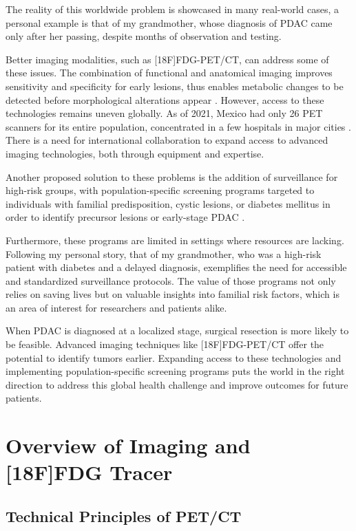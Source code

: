 \documentclass[11pt]{article} %
\begin{document}
The reality of this worldwide problem is showcased in many real-world cases, a personal example is that of my grandmother, whose diagnosis of PDAC came only after her passing, despite months of observation and testing.

Better imaging modalities, such as [18F]FDG-PET/CT, can address some of these issues. The combination of functional and anatomical imaging improves sensitivity and specificity for early lesions, thus enables metabolic changes to be detected before morphological alterations appear \cite{Pu2021}. However, access to these technologies remains uneven globally. As of 2021, Mexico had only 26 PET scanners for its entire population, concentrated in a few hospitals in major cities \cite{statista1}. There is a need for international collaboration to expand access to advanced imaging technologies, both through equipment and expertise.


Another proposed solution to these problems is the addition of surveillance for high-risk groups, with population-specific screening programs targeted to individuals with familial predisposition, cystic lesions, or diabetes mellitus in order to identify precursor lesions or early-stage PDAC \cite{Cancers2023}.

Furthermore, these programs are limited in settings where resources are lacking. Following my personal story, that of my grandmother, who was a high-risk patient with diabetes and a delayed diagnosis, exemplifies the need for accessible and standardized surveillance protocols. The value of those programs not only relies on saving lives but on valuable insights into familial risk factors, which is an area of interest for researchers and patients alike.

When PDAC is diagnosed at a localized stage, surgical resection is more likely to be feasible. Advanced imaging techniques like [18F]FDG-PET/CT offer the potential to identify tumors earlier. Expanding access to these technologies and implementing population-specific screening programs puts the world in the right direction to address this global health challenge and improve outcomes for future patients.

\section{Overview of Imaging and [18F]FDG Tracer}

\subsection{Technical Principles of PET/CT}
\end{document}
